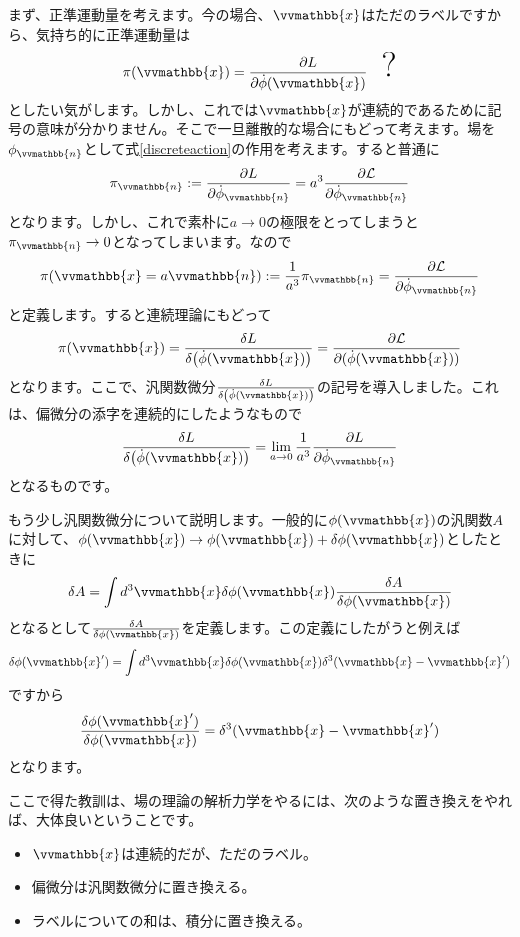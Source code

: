 \documentclass[report,paper=a4, fontsize=12pt, line_length=16cm, number_of_lines=33,dvipdfmx]{jlreq}
\numberwithin{equation}{chapter}
\newcommand{\xb}{\vvmathbb{x}}
\newcommand{\nb}{\vvmathbb{n}}
\newcommand{\Lcal}{\mathcal{L}}
\begin{document}
まず、正準運動量を考えます。今の場合、$\xb$はただのラベルですから、気持ち的に正準運動量は
\begin{align}
  \pi(\xb)=\pdv{L}{\dot{\phi}(\xb)}
  \quad \mbox{\Huge ?}
\end{align}
としたい気がします。しかし、これでは$\xb$が連続的であるために記号の意味が分かりません。そこで一旦離散的な場合にもどって考えます。場を$\phi_{\nb}$として式\eqref{discreteaction}の作用を考えます。すると普通に
\begin{align}
  \pi_{\nb}:=\pdv{L}{\dot{\phi}_{\nb}}=a^3\pdv{\Lcal}{\dot{\phi}_{\nb}}
\end{align}
となります。しかし、これで素朴に$a\to 0$の極限をとってしまうと$\pi_{\nb}\to 0$となってしまいます。なので
\begin{align}
  \pi(\xb=a\nb):=\frac{1}{a^3}\pi_{\nb}=\pdv{\Lcal}{\dot{\phi}_{\nb}}
\end{align}
と定義します。すると連続理論にもどって
\begin{align}
  \pi(\xb)=\fdv{L}{(\dot{\phi}(\xb))}=\pdv{\Lcal}{(\dot{\phi}(\xb))}
\end{align}
となります。ここで、汎関数微分$\fdv{L}{(\dot{\phi}(\xb))}$の記号を導入しました。これは、偏微分の添字を連続的にしたようなもので
\begin{align}
  \fdv{L}{(\dot{\phi}(\xb))}=\lim_{a\to 0}\frac{1}{a^3}\pdv{L}{\dot{\phi}_{\nb}}
\end{align}
となるものです。

もう少し汎関数微分について説明します。一般的に$\phi(\xb)$の汎関数$A$に対して、$\phi(\xb)\to \phi(\xb)+\delta \phi(\xb)$としたときに
\begin{align}
  \delta A=\int d^3\xb \delta \phi(\xb)\fdv{A}{\phi(\xb)}
\end{align}
となるとして$\fdv{A}{\phi(\xb)}$を定義します。この定義にしたがうと例えば
\begin{align}
  \delta \phi(\xb')=\int d^3\xb \delta \phi(\xb)\delta^3(\xb-\xb')
\end{align}
ですから
\begin{align}
  \fdv{\phi(\xb')}{\phi(\xb)}=\delta^3(\xb-\xb')
\end{align}
となります。

ここで得た教訓は、場の理論の解析力学をやるには、次のような置き換えをやれば、大体良いということです。
\begin{itemize}
  \item $\xb$は連続的だが、ただのラベル。
  \item 偏微分は汎関数微分に置き換える。
  \item ラベルについての和は、積分に置き換える。
\end{itemize}
\end{document}
